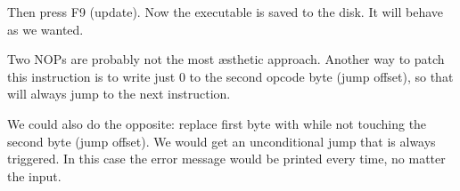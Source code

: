 Then press F9 (update). Now the executable is saved to the disk. It will behave as we wanted.

Two \ac{NOP}s are probably not the most \ae{}sthetic approach.
Another way to patch this instruction is to write just 0 to the second opcode byte (\gls{jump offset}), 
so that  will always jump to the next instruction.

We could also do the opposite: replace first byte with  while not touching the second byte (\gls{jump offset}).
We would get an unconditional jump that is always triggered.
In this case the error message would be printed every time, no matter the input.

